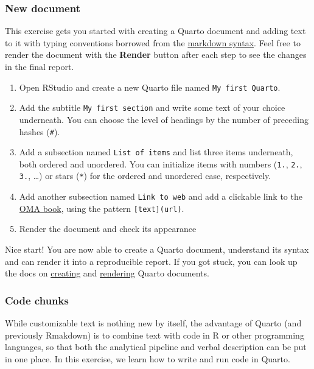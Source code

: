 \documentclass[
]{book}
\providecommand{\tightlist}{%
  \setlength{\itemsep}{0pt}\setlength{\parskip}{0pt}}
\begin{document}
\hypertarget{new-document}{%
\subsubsection{New document}\label{new-document}}

This exercise gets you started with creating a Quarto document and adding
text to it with typing conventions borrowed from the
\href{https://quarto.org/docs/authoring/markdown-basics.html}{markdown syntax}.
Feel free to render the document with the \textbf{Render} button after each step to
see the changes in the final report.

\begin{enumerate}
\def\labelenumi{\arabic{enumi}.}
\tightlist
\item
  Open RStudio and create a new Quarto file named \texttt{My\ first\ Quarto}.
\item
  Add the subtitle \texttt{My\ first\ section} and write some text of your choice
  underneath. You can choose the level of headings by the number of preceding
  hashes (\texttt{\#}).
\item
  Add a subsection named \texttt{List\ of\ items} and list three items underneath, both
  ordered and unordered. You can initialize items with numbers (\texttt{1.}, \texttt{2.},
  \texttt{3.}, \ldots) or stars (\texttt{*}) for the ordered and unordered case, respectively.
\item
  Add another subsection named \texttt{Link\ to\ web} and add a clickable link to the
  \href{https://microbiome.github.io/OMA/}{OMA book}, using the pattern \texttt{{[}text{]}(url)}.
\item
  Render the document and check its appearance
\end{enumerate}

Nice start! You are now able to create a Quarto document, understand its syntax
and can render it into a reproducible report. If you got stuck, you can look up
the docs on \href{https://quarto.org/docs/tools/rstudio.html\#creating-documents}{creating}
and \href{https://quarto.org/docs/tools/rstudio.html\#render-and-preview}{rendering}
Quarto documents.

\hypertarget{code-chunks}{%
\subsubsection{Code chunks}\label{code-chunks}}

While customizable text is nothing new by itself, the advantage of Quarto (and
previously Rmakdown) is to combine text with code in R or other programming
languages, so that both the analytical pipeline and verbal description can be
put in one place. In this exercise, we learn how to write and run code in Quarto.
\end{document}
